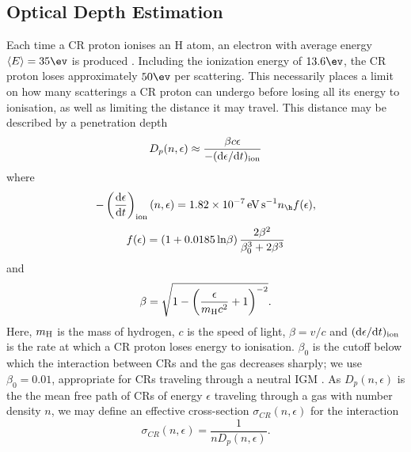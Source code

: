 \subsection{Optical Depth Estimation}
\label{attenuation}
Each time a CR proton ionises an H atom, an electron with average energy $\langle E \rangle = 35\ev$ is produced \citep{SpitzerTomasko1968}.  Including the ionization energy of $13.6\ev$, the CR proton loses approximately $50\ev$ per scattering. This necessarily places a limit on how many scatterings a CR proton can undergo before losing all its energy to ionisation, as well as limiting the distance it may travel.  This distance may be described by a penetration depth 
\begin{equation}
    D_p(n, \epsilon) \approx \frac{\beta c \epsilon} {-({\rm d}\epsilon / {\rm d}t)_{\rm ion}}
\end{equation}
where \citep{Schlickeiser2002}
\begin{equation}
    - \left( \frac{{\rm d}\epsilon} {{\rm d}t} \right)_{\rm ion}(n, \epsilon)
    = 1.82\times10^{-7}\,{\rm \small eV\,s}^{-1} n_{\h} f(\epsilon),
\end{equation}
\begin{equation}    
    f(\epsilon) = (1 + 0.0185 \,{\rm ln}\beta )\, \frac{2 \beta^2}{\beta_0^3 + 2 \beta^3}
\end{equation}
and 
\begin{equation}
    \beta =  \sqrt{1 - \left( \frac{\epsilon}{m_{\rm \tiny H}c^2}+1 \right)^{-2}}.
\end{equation}
Here, $m_{\rm \small H}$ is the mass of hydrogen, $c$ is the speed of light, $\beta = v/c$ and $({\rm d}\epsilon / {\rm d}t)_{\rm ion}$ is the rate at which a CR proton loses energy to ionisation. $\beta_0$ is the cutoff below which the interaction between CRs and the gas decreases sharply; we use $\beta_0=0.01$, appropriate for CRs traveling through a neutral IGM \citep{StacyBromm2007}.
As $D_p(n, \epsilon)$ is the the mean free path of CRs of energy $\epsilon$ traveling through a gas with number density $n$, we may define an effective cross-section $\sigma_{CR}(n,\epsilon)$ for the interaction
\begin{equation}
\sigma_{CR}(n,\epsilon) = \frac{1}{n D_p(n, \epsilon)}.
\end{equation}

